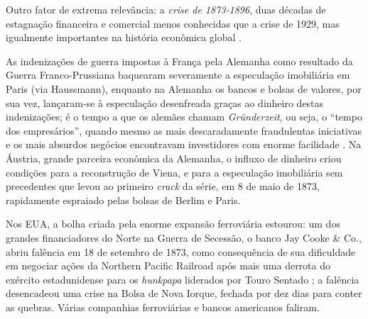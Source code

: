 Outro fator de extrema relevância: a \textit{crise de 1873-1896}, duas décadas de estagnação financeira e comercial menos conhecidas que a crise de 1929, mas igualmente importantes na história econômica global \cite{Fels1949,Fels1951,hobsbawm_empire_1989,Musson1959,Rezneck1950,Sprague1910,Persons1920}. 

As indenizações de guerra impostas à França pela Alemanha como resultado da Guerra Franco-Prussiana baquearam severamente a especulação imobiliária em Paris (via Haussmann), enquanto na Alemanha os bancos e bolsas de valores, por sua vez, lançaram-se à especulação desenfreada graças ao dinheiro destas indenizações; é o tempo a que os alemães chamam \textit{Gründerzeit}, ou seja, o ``tempo dos empresários'', quando mesmo as mais descaradamente fraudulentas iniciativas e os mais absurdos negócios encontravam investidores com enorme facilidade \cite[p.~61]{hobsbawm_capital_1977}. Na Áustria, grande parceira econômica da Alemanha, o influxo de dinheiro criou condições para a reconstrução de Viena, e para a especulação imobiliária sem precedentes que levou ao primeiro \textit{crack} da série, em 8 de maio de 1873, rapidamente espraiado pelas bolsas de Berlim e Paris.

Nos EUA, a bolha criada pela enorme expansão ferroviária estourou: um dos grandes financiadores do Norte na Guerra de Secessão, o banco Jay Cooke \& Co., abriu falência em 18 de setembro de 1873, como consequência de sua dificuldade em negociar ações da Northern Pacific Railroad após mais uma derrota do exército estadunidense para os \textit{hunkpapa} liderados por Touro Sentado \cite[p.~241-242]{utley_frontier_1973}; a falência desencadeou uma crise na Bolsa de Nova Iorque, fechada por dez dias para conter as quebras. Várias companhias ferroviárias e bancos americanos faliram. 

